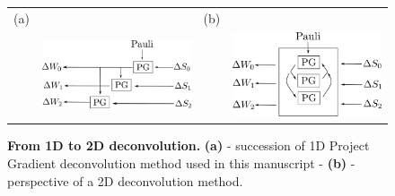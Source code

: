 \begin{figure}[hptb]
	\begin{center}
		\begin{tabular}{c c c c}
			(a) & & (b) &  \\ 
			
			& \includegraphics[scale = 0.25]{./appA/1D_deconvolution} & & \includegraphics[scale = 0.25]{./appA/2D_deconvolution} 
		\end{tabular} 
	\end{center}

	\caption{\textbf{From 1D to 2D deconvolution.} \textbf{(a)} - succession of 1D Project Gradient deconvolution method used in this manuscript - \textbf{(b)} - perspective of a 2D deconvolution method.}
	\label{fig: 1D->2D deconvolution}

\end{figure}

